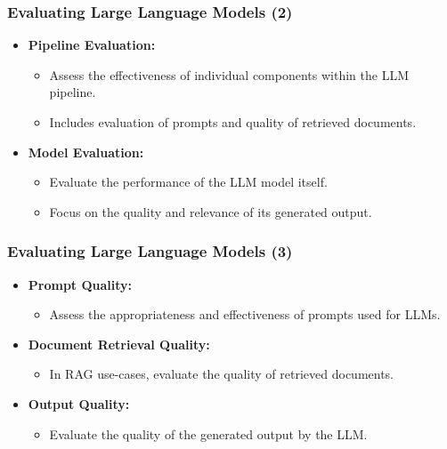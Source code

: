 \begin{frame}[fragile]\frametitle{Evaluating Large Language Models (2)}
  \begin{itemize}
    \item \textbf{Pipeline Evaluation:}
      \begin{itemize}
        \item Assess the effectiveness of individual components within the LLM pipeline.
        \item Includes evaluation of prompts and quality of retrieved documents.
      \end{itemize}
    \item \textbf{Model Evaluation:}
      \begin{itemize}
        \item Evaluate the performance of the LLM model itself.
        \item Focus on the quality and relevance of its generated output.
      \end{itemize}
  \end{itemize}
\end{frame}

\begin{frame}[fragile]\frametitle{Evaluating Large Language Models (3)}
  \begin{itemize}
    \item \textbf{Prompt Quality:}
      \begin{itemize}
        \item Assess the appropriateness and effectiveness of prompts used for LLMs.
      \end{itemize}
    \item \textbf{Document Retrieval Quality:}
      \begin{itemize}
        \item In RAG use-cases, evaluate the quality of retrieved documents.
      \end{itemize}
    \item \textbf{Output Quality:}
      \begin{itemize}
        \item Evaluate the quality of the generated output by the LLM.
      \end{itemize}
  \end{itemize}
\end{frame}



